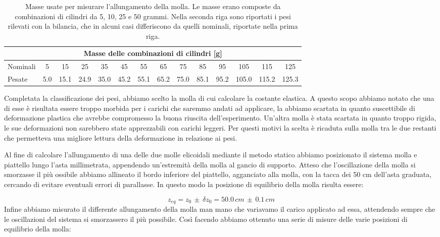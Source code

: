 \begin{table}[tb]
    \centering
    \small
    \begin{tabular}{l | c c c c c c c c c c c c c}
        \multicolumn{14}{c}{Masse delle combinazioni di cilindri [g]} \\[1mm]
        \toprule
        Nominali & 5 & 15 & 25 & 35 & 45 & 55 & 65 & 75 & 85 & 95 & 105 & 115 & 125 \\
        Pesate & 5.0 & 15.1 & 24.9 & 35.0 & 45.2 & 55.1 & 65.2 & 75.0 & 85.1 & 95.2 & 105.0 & 115.2 & 125.3 \\
        \bottomrule
    \end{tabular}
    \caption{Masse usate per misurare l'allungamento della molla. Le masse erano composte da combinazioni
    di cilindri da 5, 10, 25 e 50 grammi. Nella seconda riga sono riportati i pesi rilevati con
    la bilancia, che in alcuni casi differiscono da quelli nominali, riportate nella prima riga.}
    \label{tab:masse}
\end{table}

Completata la classificazione dei pesi, abbiamo scelto la molla di cui calcolare la
costante elastica. A questo scopo abbiamo notato che una di esse è risultata essere troppo
morbida per i carichi che saremmo andati ad applicare, la abbiamo scartata in quanto suscettibile di
deformazione plastica che avrebbe compromesso la buona riuscita dell'esperimento.
Un'altra molla è stata scartata in quanto troppo rigida, le sue deformazioni non sarebbero state
apprezzabili con carichi leggeri. Per questi motivi la scelta è ricaduta sulla molla tra 
le due restanti che permetteva una migliore lettura della deformazione in relazione ai pesi.

Al fine di calcolare l'allungamento di una delle due molle elicoidali mediante il metodo statico abbiamo posizionato il sistema molla e piattello lungo l'asta millimetrata, appendendo un'estremità della molla al gancio di supporto. Atteso che l'oscillazione della molla si smorzasse il più ossibile abbiamo allineato il bordo inferiore del piattello, agganciato alla molla, con la tacca dei 50 cm dell'asta graduata, cercando di evitare eventuali errori di parallasse. In questo modo la posizione di equilibrio della molla risulta essere:

\begin{equation*}
	z_{eq} = z_0\,\pm\,\delta z_0 = 50.0\,cm\,\pm\,0.1\,cm
\end{equation*}
Infine abbiamo misurato il differente allungamento della molla man mano che variavamo il carico applicato ad essa, attendendo sempre che le oscillazioni del sistema si smorzassero il più possibile. Così facendo abbiamo ottenuto una serie di misure delle varie posizioni di equilibrio della molla:

